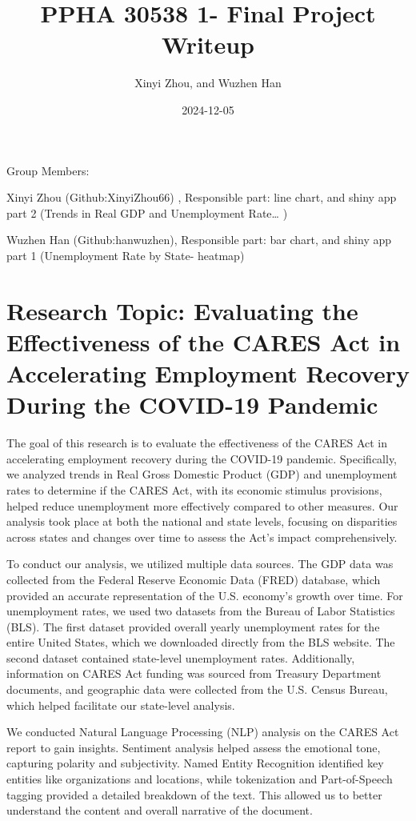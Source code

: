 \documentclass[
]{article}
\title{PPHA 30538 1- Final Project Writeup}
\author{Xinyi Zhou, and Wuzhen Han}
\date{2024-12-05}
\begin{document}
\maketitle



Group Members:

Xinyi Zhou (Github:XinyiZhou66) , Responsible part: line chart, and
shiny app part 2 (Trends in Real GDP and Unemployment Rate\ldots{} )

Wuzhen Han (Github:hanwuzhen), Responsible part: bar chart, and shiny
app part 1 (Unemployment Rate by State- heatmap)

\section{Research Topic: Evaluating the Effectiveness of the CARES Act
in Accelerating Employment Recovery During the COVID-19
Pandemic}\label{research-topic-evaluating-the-effectiveness-of-the-cares-act-in-accelerating-employment-recovery-during-the-covid-19-pandemic}

The goal of this research is to evaluate the effectiveness of the CARES
Act in accelerating employment recovery during the COVID-19 pandemic.
Specifically, we analyzed trends in Real Gross Domestic Product (GDP)
and unemployment rates to determine if the CARES Act, with its economic
stimulus provisions, helped reduce unemployment more effectively
compared to other measures. Our analysis took place at both the national
and state levels, focusing on disparities across states and changes over
time to assess the Act's impact comprehensively.

To conduct our analysis, we utilized multiple data sources. The GDP data
was collected from the Federal Reserve Economic Data (FRED) database,
which provided an accurate representation of the U.S. economy's growth
over time. For unemployment rates, we used two datasets from the Bureau
of Labor Statistics (BLS). The first dataset provided overall yearly
unemployment rates for the entire United States, which we downloaded
directly from the BLS website. The second dataset contained state-level
unemployment rates. Additionally, information on CARES Act funding was
sourced from Treasury Department documents, and geographic data were
collected from the U.S. Census Bureau, which helped facilitate our
state-level analysis.

We conducted Natural Language Processing (NLP) analysis on the CARES Act
report to gain insights. Sentiment analysis helped assess the emotional
tone, capturing polarity and subjectivity. Named Entity Recognition
identified key entities like organizations and locations, while
tokenization and Part-of-Speech tagging provided a detailed breakdown of
the text. This allowed us to better understand the content and overall
narrative of the document.
\end{document}
